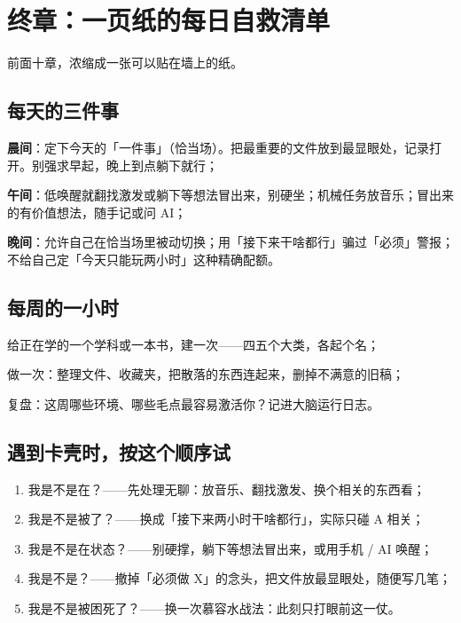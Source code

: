 \section{终章：一页纸的每日自救清单}

前面十章，浓缩成一张可以贴在墙上的纸。

\subsection{每天的三件事}

\begin{checklist}
  \item \textbf{晨间}：定下今天的「一件事」（恰当场）。把最重要的文件放到最显眼处，记录打开。别强求早起，晚上到点躺下就行；
  \item \textbf{午间}：低唤醒就翻找激发或躺下等想法冒出来，别硬坐；机械任务放音乐；冒出来的有价值想法，随手记或问 AI；
  \item \textbf{晚间}：允许自己在恰当场里被动切换；用「接下来干啥都行」骗过「必须」警报；不给自己定「今天只能玩两小时」这种精确配额。
\end{checklist}

\subsection{每周的一小时}

\begin{checklist}
  \item 给正在学的一个学科或一本书，建一次——四五个大类，各起个名；
  \item 做一次：整理文件、收藏夹，把散落的东西连起来，删掉不满意的旧稿；
  \item 复盘：这周哪些环境、哪些毛点最容易激活你？记进大脑运行日志。
\end{checklist}

\subsection{遇到卡壳时，按这个顺序试}

\begin{enumerate}[leftmargin=2em,itemsep=2pt]
  \item 我是不是在？——先处理无聊：放音乐、翻找激发、换个相关的东西看；
  \item 我是不是被了？——换成「接下来两小时干啥都行」，实际只碰 A 相关；
  \item 我是不是在状态？——别硬撑，躺下等想法冒出来，或用手机 / AI 唤醒；
  \item 我是不是？——撤掉「必须做 X」的念头，把文件放最显眼处，随便写几笔；
  \item 我是不是被困死了？——换一次慕容水战法：此刻只打眼前这一仗。
\end{enumerate}

